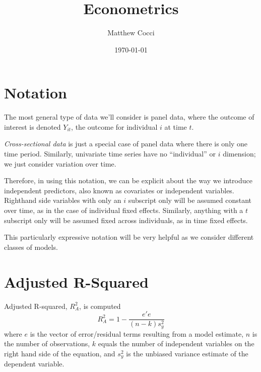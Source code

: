 \documentclass[a4paper,12pt]{scrartcl}
\author{Matthew Cocci}
\title{Econometrics}
\date{\today}
\begin{document}
\maketitle


\section{Notation}

The most general type of data we'll consider is  panel data, where the outcome of interest is denoted $Y_{it}$, the outcome for individual $i$ at time $t$.

\emph{Cross-sectional data} is just a special case of panel data where there is only one time period.  Similarly, univariate time series have no ``individual'' or $i$ dimension; we just consider variation over time.

Therefore, in using this notation, we can be explicit about the way we introduce independent predictors, also known as covariates or independent variables. Righthand side variables with only an $i$ subscript only will be assumed constant over time, as in the case of individual fixed effects.  Similarly, anything with a $t$ subscript only will be assumed fixed across individuals, as in time fixed effects.

This particularly expressive notation will be very helpful as we consider different classes of models.





\appendix


\section{Adjusted R-Squared}

Adjusted R-squared, $R^2_A$, is computed 
\[ R^2_A = 1 - \frac{e'e }{(n-k) s_y^2} \]
where $e$ is the vector of error/residual terms resulting from a 
model estimate,
$n$ is the number of observations, $k$ equals the number of 
independent variables on the right hand side of the equation, and
$s_y^2$ is the unbiased variance estimate of the dependent variable.
\end{document}
